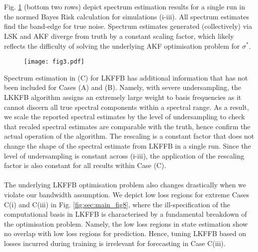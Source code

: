 \\
\\
Fig. \ref{fig:sec:main_fig3} (bottom two rows) depict spectrum estimation results for a single run in the normed Bayes Risk calculation for simulations (i-iii). All spectrum estimates find the band-edge for true noise. Spectrum estimates generated  (collectively) via LSK and AKF diverge from truth by a constant scaling factor, which likely reflects the difficulty of solving the underlying AKF optimisation problem for $\sigma^*$. 
\newpage
\onecolumngrid
 \begin{figure}[h!]
	\centering
	\caption{} \label{fig:sec:main_fig3}
	\texttt{[image: fig3.pdf]}
\end{figure} 
\FloatBarrier
\twocolumngrid
Spectrum estimation in (C) for LKFFB has additional information that has not been included for Cases (A) and (B). Namely, with severe undersampling, the LKKFB algorithm assigns an extremely large weight to basis frequencies as it cannot discern all true spectral components within a spectral range. As a result, we scale the reported spectral estimates by the level of undersampling to check that recaled spectral estimates are comparable with the truth, hence confirm the actual operation of the algorithm. The rescaling is a constant factor that does not change the shape of the spectral estimate from LKFFB in a single run. Since the level of undersampling is constant across (i-iii), the application of the rescaling factor is also constant for all results within Case (C). 
\\
\\
The underlying LKFFB optimisation problem also changes drastically when we violate our bandwidth assumption. We depict low loss regions for extreme Cases C(i) and C(iii) in Fig. \ref{fig:sec:main_fig8}, where the ill-specification of the computational basis in LKFFB is characterised by a fundamental breakdown of the optimisation problem. Namely, the low loss regions in state estimation show no overlap with low loss regions for prediction. Hence, tuning LKFFB based on losses incurred during training is irrelevant for forecasting in Case C(iii).


